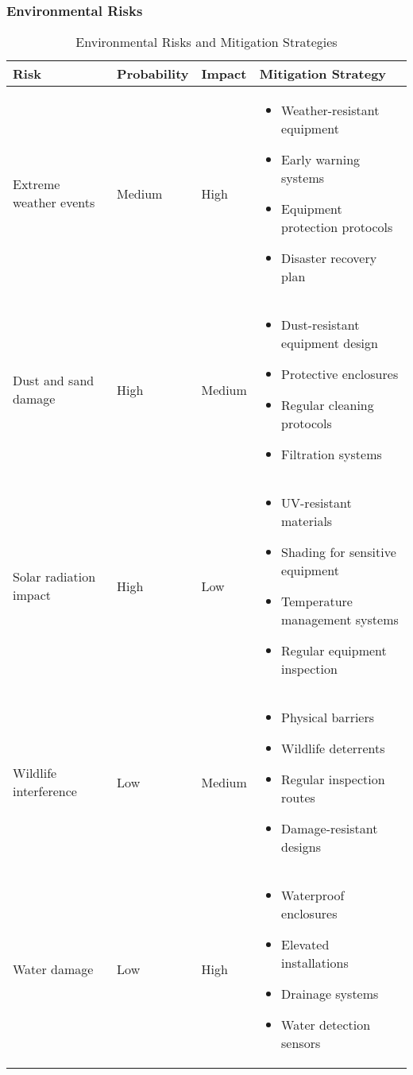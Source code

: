 \subsubsection{Environmental Risks}
\begin{table}[H]
\centering
\begin{tabular}{|p{3cm}|p{2cm}|p{2cm}|p{7cm}|}
\hline
\textbf{Risk} & \textbf{Probability} & \textbf{Impact} & \textbf{Mitigation Strategy} \\
\hline
Extreme weather events & Medium & High & 
\begin{itemize}
    \item Weather-resistant equipment
    \item Early warning systems
    \item Equipment protection protocols
    \item Disaster recovery plan
\end{itemize} \\
\hline
Dust and sand damage & High & Medium & 
\begin{itemize}
    \item Dust-resistant equipment design
    \item Protective enclosures
    \item Regular cleaning protocols
    \item Filtration systems
\end{itemize} \\
\hline
Solar radiation impact & High & Low & 
\begin{itemize}
    \item UV-resistant materials
    \item Shading for sensitive equipment
    \item Temperature management systems
    \item Regular equipment inspection
\end{itemize} \\
\hline
Wildlife interference & Low & Medium & 
\begin{itemize}
    \item Physical barriers
    \item Wildlife deterrents
    \item Regular inspection routes
    \item Damage-resistant designs
\end{itemize} \\
\hline
Water damage & Low & High & 
\begin{itemize}
    \item Waterproof enclosures
    \item Elevated installations
    \item Drainage systems
    \item Water detection sensors
\end{itemize} \\
\hline
\end{tabular}
\caption{Environmental Risks and Mitigation Strategies}
\end{table}

